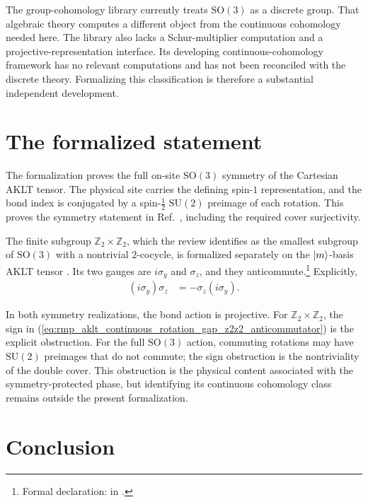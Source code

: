 \documentclass[11pt]{article}
\begin{document}
The group-cohomology library currently treats $\mathrm{SO}(3)$ as a discrete
group. That algebraic theory computes a different object from the continuous
cohomology needed here. The library also lacks a Schur-multiplier computation
and a projective-representation interface. Its developing
continuous-cohomology framework has no relevant computations and has not been
reconciled with the discrete theory. Formalizing this classification is
therefore a substantial independent development.

\section{The formalized statement}

The formalization proves the full on-site $\mathrm{SO}(3)$ symmetry of the
Cartesian AKLT tensor. The physical site carries the defining spin-$1$
representation, and the bond index is conjugated by a spin-$\tfrac{1}{2}$
$\mathrm{SU}(2)$ preimage of each rotation. This proves the symmetry statement
in Ref.~\cite{Cirac2021Matrix}, including the required cover surjectivity.

The finite subgroup $\mathbb{Z}_2\times\mathbb{Z}_2$, which the review
identifies as the smallest subgroup of $\mathrm{SO}(3)$ with a nontrivial
$2$-cocycle, is formalized separately on the $|m\rangle$-basis AKLT tensor
\cite{Cirac2021Matrix}. Its two gauges are $i\sigma_y$ and $\sigma_z$, and
they anticommute.\footnote{Formal declaration:
 in
.} Explicitly,
\begin{align}
    (i\sigma_y)\sigma_z
        &=-\sigma_z(i\sigma_y).
    \label{eq:rmp_aklt_continuous_rotation_gap_z2z2_anticommutator}
\end{align}

In both symmetry realizations, the bond action is projective. For
$\mathbb{Z}_2\times\mathbb{Z}_2$, the sign in
(\ref{eq:rmp_aklt_continuous_rotation_gap_z2z2_anticommutator}) is the explicit
obstruction. For the full $\mathrm{SO}(3)$ action, commuting rotations may
have $\mathrm{SU}(2)$ preimages that do not commute; the sign obstruction is
the nontriviality of the double cover. This obstruction is the physical
content associated with the symmetry-protected phase, but identifying its
continuous cohomology class remains outside the present formalization.

\section{Conclusion}
\end{document}
